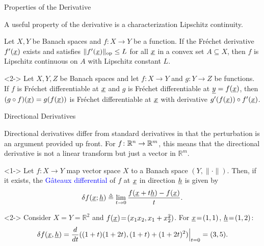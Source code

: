 \documentclass[10pt,english,aspectratio=169]{beamer}
\begin{document}
\begin{frame}{Properties of the Derivative}

A useful property of the derivative is a characterization Lipschitz continuity.

\begin{lemma}
Let $X,Y$ be Banach spaces and $f \colon X \rightarrow Y$ be a function.
If the Fr\'{e}chet derivative $f'(\underline{x})$ exists and satisfies $\| f'(\underline{x})\|_{\mathrm{op}} \leq L$ for all $\underline{x}$ in a convex set $A\subseteq X$, then $f$ is Lipschitz continuous on $A$ with Lipschitz constant $L$.
\end{lemma}

\vspace{4mm}


\begin{theorem}<2->
Let $X,Y,Z$ be Banach spaces and let $f \colon X \rightarrow Y$ and $g\colon Y \to Z$ be functions.
If $f$ is Fr\'{e}chet differentiable at $\underline{x}$ and $g$ is Fr\'{e}chet differentiable at $\underline{y}=f(\underline{x})$, then $(g \circ f) (\underline{x}) = g(f(\underline{x}))$ is Fr\'{e}chet differentiable at $\underline{x}$ with derivative $g'(f(\underline{x}))\circ f'(\underline{x})$.
\end{theorem}


\end{frame}

\begin{frame}{Directional Derivatives}

Directional derivatives differ from standard derivatives in that the perturbation is an argument provided up front.
For $f\colon \mathbb{R}^n \to \mathbb{R}^m$, this means that the directional derivative is not a linear transform but just a vector in $\mathbb{R}^m$.

\vspace{2mm}

\begin{definition}<1->
Let $f \colon X \rightarrow Y$ map vector space $X$ to a Banach space $(Y,\|\cdot\|)$.
Then, if it exists, the \textcolor{blue}{G\^{a}teaux differential} of $f$ at  $\underline{x}$ in direction $\underline{h}$ is given by \vspace{-1.5mm}
\[ \delta f (\underline{x};\underline{h}) \triangleq \lim_{t \to 0} \frac{f(\underline{x}+t \underline{h}) - f(\underline{x})}{t}. \]
\end{definition}

\begin{example}<2->
Consider $X\!=\!Y\!=\!\mathbb{R}^2$ and $f(\underline{x})\! =\! (x_1 x_2,x_1+x_2^2)$.
For $\underline{x}\!=\!(1,1)$, $\underline{h}\!=\!(1,2)$: \vspace{-2.5mm}
\[ \delta f ( \underline{x},\underline{h} ) = \frac{d}{dt} ((1+t)(1+2t),(1+t)+(1+2t)^2) \Big|_{t=0} = (3,5). \]
\end{example}


\end{frame}
\end{document}
